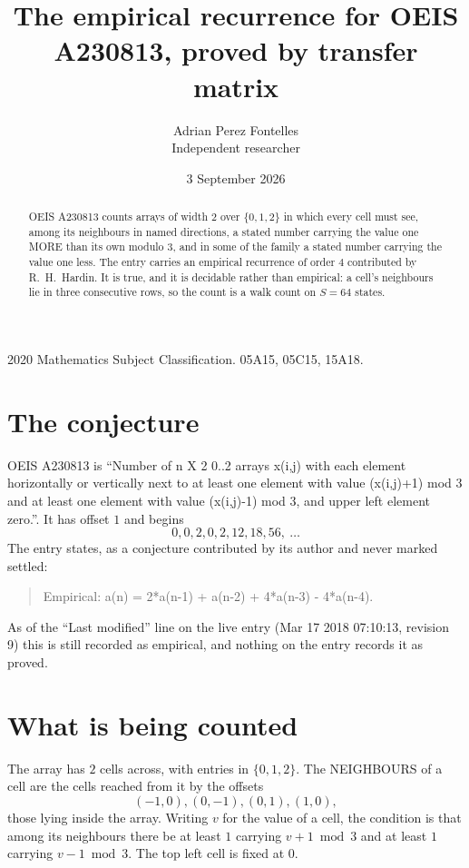 \documentclass[11pt,a4paper]{article}
\title{The empirical recurrence for OEIS A230813, proved by transfer matrix}
\author{Adrian Perez Fontelles\\ \small Independent researcher}
\date{3 September 2026}
\theoremstyle{plain}
\theoremstyle{definition}
\begin{document}
\maketitle

\begin{abstract}
OEIS A230813 counts arrays of width $2$ over $\{0,1,2\}$ in which every cell must see, among its
neighbours in named directions, a stated number carrying the value one MORE than its own
modulo $3$, and in some of the family a stated number carrying the value one less. The entry
carries an empirical recurrence of order $4$ contributed by R.~H.~Hardin. It is true, and
it is decidable rather than empirical: a cell's neighbours lie in three consecutive rows, so
the count is a walk count on $S=64$ states.
\end{abstract}

\noindent\small 2020 Mathematics Subject Classification. 05A15, 05C15, 15A18.\normalsize

\section{The conjecture}

OEIS A230813 is ``Number of n X 2 0..2 arrays x(i,j) with each element horizontally or vertically next to at least one element with value (x(i,j)+1) mod 3 and at least one element with value (x(i,j)-1) mod 3, and upper left element zero.''. It has offset $1$ and begins
\[
0, 0, 2, 0, 2, 12, 18, 56,\ \dots
\]
The entry states, as a conjecture contributed by its author and never marked settled:
\begin{quote}
Empirical: a(n) = 2*a(n-1) + a(n-2) + 4*a(n-3) - 4*a(n-4).
\end{quote}
As of the ``Last modified'' line on the live entry (Mar 17 2018 07:10:13, revision 9) this is still
recorded as empirical, and nothing on the entry records it as proved.

\section{What is being counted}

The array has $2$ cells across, with entries in $\{0,1,2\}$. The NEIGHBOURS of a cell are the
cells reached from it by the offsets
\[
(-1,0), (0,-1), (0,1), (1,0),
\]
those lying inside the array. Writing $v$ for the value of a cell, the condition is that among
its neighbours there be at least $1$ carrying $v+1 \bmod 3$ and at least $1$ carrying $v-1 \bmod 3$. The top left
cell is fixed at $0$.
\end{document}
